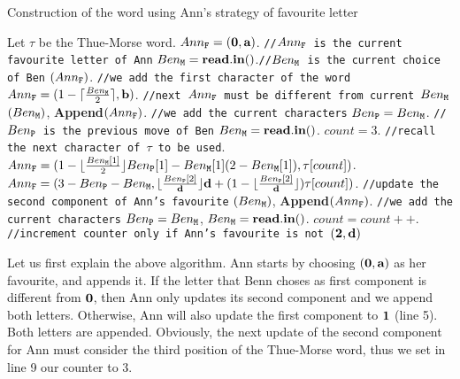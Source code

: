 \documentclass[runningheads,fleqn]{llncs}
\begin{document}
\begin{algorithm}[h!]
\caption{Construction of the word using Ann's strategy of favourite letter}
\begin{algorithmic}[1]\label{minper}
\STATE Let $\tau$ be the Thue-Morse word.
\STATE $Ann_{\tt F}=(\textbf 0,\textbf a)$.		\hfill {\scriptsize \tt//$Ann_{\tt F}$ is the current favourite letter of Ann}
\STATE $Ben_{\tt  M}={\bf read.in()}$.\hfill {\scriptsize \tt//$Ben_{\tt M}$ is the current choice of Ben}
$(Ann_{\tt F})$. \hfill {\scriptsize \tt//we add the first character of the word}
\STATE $Ann_{\tt F}=(1-\lceil \frac{Ben_{\tt M}}{2}\rceil,\textbf b)$.	\hfill {\scriptsize \tt//next $Ann_{\tt F}$ must be different from current $Ben_{\tt M}$}
$(Ben_{\tt M})$, {\bf Append}$(Ann_{\tt F})$. \hfill {\scriptsize \tt//we add the current characters}
\STATE $Ben_{\tt P}=Ben_{\tt M}$. \hfill {\scriptsize \tt//$Ben_{\tt P}$ is the previous move of Ben}
\STATE $Ben_{\tt M}={\bf read.in()}$.
\STATE $count=3$.		\hfill {\scriptsize \tt//recall the next character of $\tau$ to be used}.
		\STATE $Ann_{\tt F}=(1-\lfloor \frac{Ben_{\tt M}[1]}{2}\rfloor Ben_{\tt P}[1] - Ben_{\tt M}[1] (2-Ben_{\tt M}[1]),\tau[count])$.
		\STATE $Ann_{\tt F}=(3-Ben_{\tt P}-Ben_{\tt M},\lfloor \frac{Ben_{\tt P}[2]}{\textbf d}\rfloor \textbf d +(1-\lfloor \frac{Ben_{\tt P}[2]}{\textbf d}\rfloor)\tau[count])$.
	\ELSE 
	 \hfill{\scriptsize \tt{/}{/}update the second component of Ann's favourite}
	\ENDIF
{}$(Ben_{\tt M})$, {\bf Append}$(Ann_{\tt F})$. \hfill {\scriptsize \tt//we add the current characters}
\STATE $Ben_{\tt P}=Ben_{\tt M}$, $Ben_{\tt M}={\bf read.in()}$.
	\STATE  $count=count{+}{+}$. \hfill {\scriptsize \tt//increment counter only if Ann's favourite is not $(\textbf 2,\textbf d)$}
\ENDIF
\ENDWHILE
\end{algorithmic}
\end{algorithm}

Let us first explain the above algorithm. Ann starts by choosing $(\textbf 0,\textbf a)$ as her favourite, and appends it. If the letter that Benn choses as first component is different from $\textbf 0$, then Ann only updates its second component and we append both letters. Otherwise, Ann will also update the first component to $\textbf 1$ (line 5). Both letters are appended. Obviously, the next update of the second component for Ann must consider the third position of the Thue-Morse word, thus we set in line 9 our counter to 3.
\end{document}
